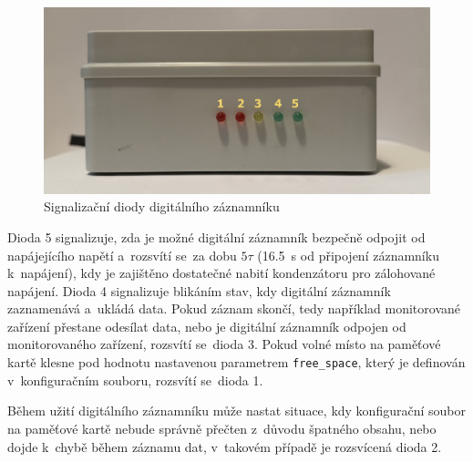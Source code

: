 \begin{figure}[h]
    \centering
    \includegraphics[width=1.00\textwidth]{obrazky-figures/leds-resized-marked.jpg}
    
    \caption{Signalizační diody digitálního záznamníku}
    \label{fig:signal-diodes}
\end{figure}

Dioda 5 signalizuje, zda je možné digitální záznamník bezpečně odpojit od napájejícího napětí a~rozsvítí se~za dobu $5\tau$ (\SI{16.5}{\second} od připojení záznamníku k~napájení), kdy je zajištěno dostatečné nabití kondenzátoru pro zálohované napájení. Dioda 4 signalizuje blikáním stav, kdy digitální záznamník zaznamenává a~ukládá data. Pokud záznam skončí, tedy například monitorované zařízení přestane odesílat data, nebo je digitální záznamník odpojen od monitorovaného zařízení, rozsvítí se~dioda 3. Pokud volné místo na paměťové kartě klesne pod hodnotu nastavenou parametrem \texttt{free\_space}, který je definován v~konfiguračním souboru, rozsvítí se~dioda 1.

Během užití digitálního záznamníku může nastat situace, kdy konfigurační soubor na paměťové kartě nebude správně přečten z~důvodu špatného obsahu, nebo dojde k~chybě během záznamu dat, v~takovém případě je rozsvícená dioda 2.



